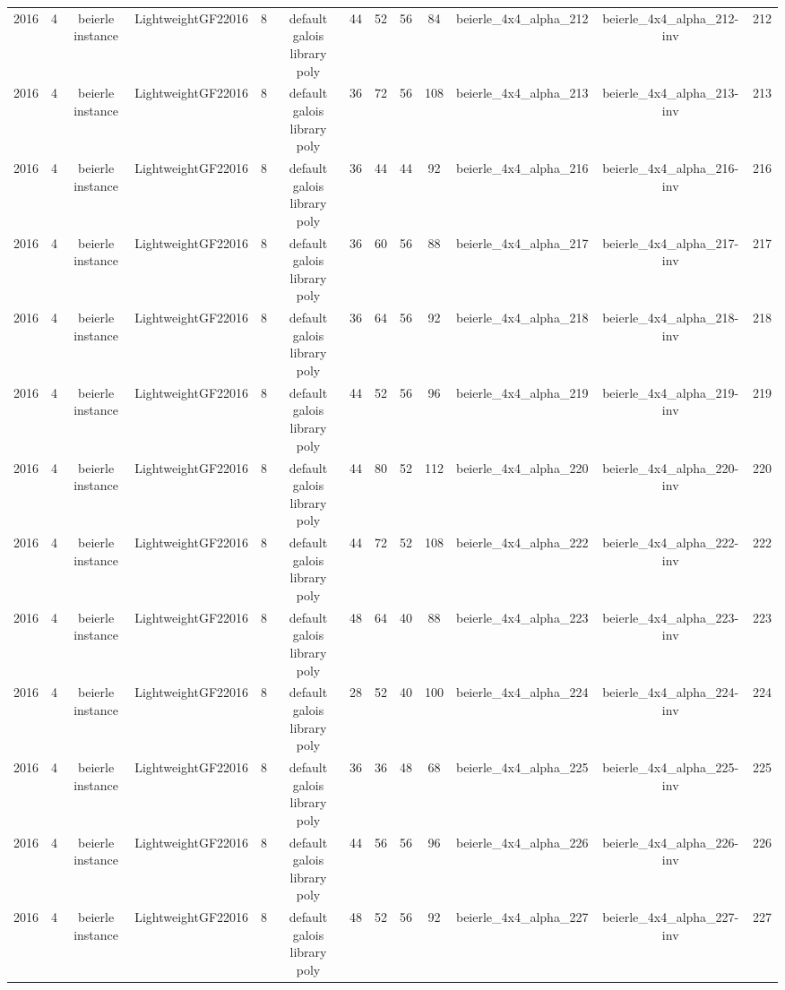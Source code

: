 \begin{tabular}{c c c c c c c c c c c c c}
2016 & 4 & beierle instance & LightweightGF22016 & 8 & default galois library poly & 44 & 52 & 56 & 84 & beierle_4x4_alpha_212 & beierle_4x4_alpha_212-inv & 212 \\
2016 & 4 & beierle instance & LightweightGF22016 & 8 & default galois library poly & 36 & 72 & 56 & 108 & beierle_4x4_alpha_213 & beierle_4x4_alpha_213-inv & 213 \\
2016 & 4 & beierle instance & LightweightGF22016 & 8 & default galois library poly & 36 & 44 & 44 & 92 & beierle_4x4_alpha_216 & beierle_4x4_alpha_216-inv & 216 \\
2016 & 4 & beierle instance & LightweightGF22016 & 8 & default galois library poly & 36 & 60 & 56 & 88 & beierle_4x4_alpha_217 & beierle_4x4_alpha_217-inv & 217 \\
2016 & 4 & beierle instance & LightweightGF22016 & 8 & default galois library poly & 36 & 64 & 56 & 92 & beierle_4x4_alpha_218 & beierle_4x4_alpha_218-inv & 218 \\
2016 & 4 & beierle instance & LightweightGF22016 & 8 & default galois library poly & 44 & 52 & 56 & 96 & beierle_4x4_alpha_219 & beierle_4x4_alpha_219-inv & 219 \\
2016 & 4 & beierle instance & LightweightGF22016 & 8 & default galois library poly & 44 & 80 & 52 & 112 & beierle_4x4_alpha_220 & beierle_4x4_alpha_220-inv & 220 \\
2016 & 4 & beierle instance & LightweightGF22016 & 8 & default galois library poly & 44 & 72 & 52 & 108 & beierle_4x4_alpha_222 & beierle_4x4_alpha_222-inv & 222 \\
2016 & 4 & beierle instance & LightweightGF22016 & 8 & default galois library poly & 48 & 64 & 40 & 88 & beierle_4x4_alpha_223 & beierle_4x4_alpha_223-inv & 223 \\
2016 & 4 & beierle instance & LightweightGF22016 & 8 & default galois library poly & 28 & 52 & 40 & 100 & beierle_4x4_alpha_224 & beierle_4x4_alpha_224-inv & 224 \\
2016 & 4 & beierle instance & LightweightGF22016 & 8 & default galois library poly & 36 & 36 & 48 & 68 & beierle_4x4_alpha_225 & beierle_4x4_alpha_225-inv & 225 \\
2016 & 4 & beierle instance & LightweightGF22016 & 8 & default galois library poly & 44 & 56 & 56 & 96 & beierle_4x4_alpha_226 & beierle_4x4_alpha_226-inv & 226 \\
2016 & 4 & beierle instance & LightweightGF22016 & 8 & default galois library poly & 48 & 52 & 56 & 92 & beierle_4x4_alpha_227 & beierle_4x4_alpha_227-inv & 227 \\

\end{tabular}

